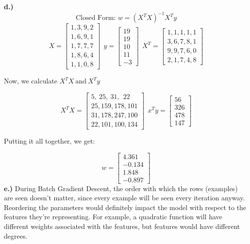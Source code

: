 \documentclass[11pt]{article}
\begin{document}
\textbf{d.)}
\begin{equation}
\text{Closed Form: } w = (X^TX)^{-1}X^Ty
\end{equation}
\[X =
\begin{bmatrix}
1, 3, 9, 2\\
1, 6, 9, 1\\
1, 7, 7, 7\\
1, 8, 6, 4\\
1, 1, 0, 8
\end{bmatrix}
\ \ y =
\begin{bmatrix}
19\\
19\\
10\\
11\\
-3
\end{bmatrix}
\ \ X^T = 
\begin{bmatrix}
1, 1, 1, 1, 1\\
3, 6, 7, 8, 1\\
9, 9, 7, 6, 0\\
2, 1, 7, 4, 8
\end{bmatrix}
\]
\begin{center}
\pagebreak
Now, we calculate $X^TX \ \text{and} \ X^Ty$
\end{center}
\[X^TX = 
\begin{bmatrix}
5, \ 25, \ 31, \ \ 22\\
25, 159, 178, 101\\
31, 178, 247, 100\\
22, 101, 100, 134
\end{bmatrix}
\ \ x^Ty = 
\begin{bmatrix}
56\\
326\\
478\\
147
\end{bmatrix}
\]
\begin{center}
Putting it all together, we get:
\end{center}
\[w= 
\begin{bmatrix}
4.361\\
-0.134\\
1.848\\
-0.897
\end{bmatrix}\]
\textbf{e.)}
During Batch Gradient Descent, the order with which the rows (examples) are seen doesn't matter, since every example will be seen every iteration anyway. Reordering the parameters would definitely impact the model with respect to the features they're representing. For example, a quadratic function will have different weights associated with the features, but features would have different degrees.
\end{document}
